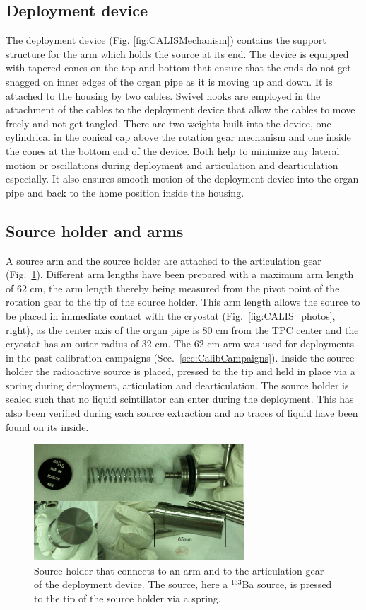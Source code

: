 \subsection{Deployment device}
The deployment device (Fig. \ref{fig:CALISMechanism}) contains the support structure for the arm which holds the source at its end. The device is equipped with tapered cones on the top and bottom that ensure that the ends do not get snagged on inner edges of the organ pipe as it is moving up and down. It is attached to the housing by two cables.  Swivel hooks are employed in the attachment of the cables to the deployment device that allow the cables to move freely and not get tangled. 
There are two weights built into the device, one cylindrical in the conical cap above the rotation gear mechanism and one inside the cones at the bottom end of the device. Both help to minimize any lateral motion or oscillations during deployment and articulation and dearticulation especially. It also ensures smooth motion of the deployment device into the organ pipe and back to the home position inside the housing.

\subsection{Source holder and arms}
A source arm and the source holder are attached to the articulation gear (Fig.~\ref{fig:SourceHolder}). Different arm lengths have been prepared with a maximum arm length of 62 cm, the arm length thereby being measured from the pivot point of the rotation gear to the tip of the source holder. This arm length allows the source to be placed in immediate contact with the cryostat (Fig.~\ref{fig:CALIS_photos}, right), as the center axis of the organ pipe is 80 cm from the TPC center and the cryostat has an outer radius of 32 cm. The 62 cm arm was used for deployments in the past calibration campaigns (Sec.~\ref{sec:CalibCampaigns}). Inside the source holder the radioactive source is placed, pressed to the tip and held in place via a spring during deployment, articulation and dearticulation. The source holder is sealed such that no liquid scintillator can enter during the deployment. This has also been verified during each source extraction and no traces of liquid have been found on its inside.

\begin{figure}[htbp]
 \centering
  \includegraphics[width=0.7\textwidth]{Figures/SourceHolder.png}
  \caption{Source holder that connects to an arm and to the articulation gear of the deployment device. The source, here a $^{133}$Ba source, is pressed to the tip of the source holder via a spring.}
  \label{fig:SourceHolder}
\end{figure}